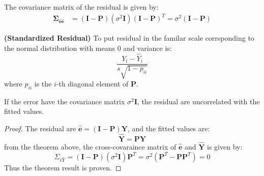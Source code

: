 \begin{proposition}
    The covariance matrix of the residual is given by:
    \begin{equation*}
    \begin{aligned}
        \boldsymbol \Sigma_{\hat{\boldsymbol e}\hat{\boldsymbol e}} &= (\boldsymbol I - \boldsymbol P)(\sigma^2\boldsymbol I)(\boldsymbol I - \boldsymbol P)^T = \sigma^2(\boldsymbol I - \boldsymbol P)
    \end{aligned}
    \end{equation*}
\end{proposition}

\begin{definition}{\textbf{(Standardized Residual)}}
    To put residual in the familar scale corrsponding to the normal distribution with means $0$ and variance is:
    \begin{equation*}
        \frac{Y_i-\hat{Y}_i}{s\sqrt{1 - p_{ii}}}
    \end{equation*}
    where $p_{ii}$ is the $i$-th diagonal element of $\boldsymbol P$.
\end{definition}

\begin{theorem}
    If the error have the covariance matrix $\sigma^2\boldsymbol I$, the residual are uncorrelated with the fitted values. 
\end{theorem}
\begin{proof}
    The residual are $\hat{\boldsymbol e} = (\boldsymbol I - \boldsymbol P)\boldsymbol Y$, and the fitted values are:
    \begin{equation*}
        \hat{\boldsymbol Y} = \boldsymbol P\boldsymbol Y
    \end{equation*}
    from the theorem above, the cross-covaraince matrix of $\hat{\boldsymbol e}$ and $\hat{\boldsymbol Y}$ is given by:
    \begin{equation*}
        \Sigma_{\hat{e}\hat{Y}} = (\boldsymbol I-\boldsymbol P)(\sigma^2\boldsymbol I)\boldsymbol P^T = \sigma^2(\boldsymbol P^T-\boldsymbol P\boldsymbol P^T) = 0
    \end{equation*}
    Thus the theorem result is proven. 
\end{proof}

